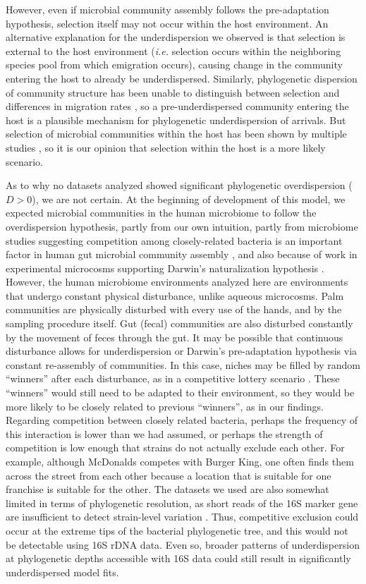\documentclass{article}
\begin{document}
\par
However, even if microbial community assembly follows the pre-adaptation hypothesis, selection itself may not occur within the host environment. An alternative explanation for the underdispersion we observed is that selection is external to the host environment (\emph{i.e.} selection occurs within the neighboring species pool from which emigration occurs), causing change in the community entering the host to already be underdispersed. Similarly, phylogenetic dispersion of community structure has been unable to distinguish between selection and differences in migration rates \cite{Emerson2008}, so a pre-underdispersed community entering the host is a plausible mechanism for phylogenetic underdispersion of arrivals. But selection of microbial communities within the host has been shown by multiple studies \cite{Peterfreund2012,David2014,Kennedy2016}, so it is our opinion that selection within the host is a more likely scenario.
\par
As to why no datasets analyzed showed significant phylogenetic overdispersion (\(D > 0\)), we are not certain. At the beginning of development of this model, we expected microbial communities in the human microbiome to follow the overdispersion hypothesis, partly from our own intuition, partly from microbiome studies suggesting competition among closely-related bacteria is an important factor in human gut microbial community assembly \cite{Chatzidaki-Livanis3627,Hecht1281}, and also because of work in experimental microcosms supporting Darwin’s naturalization hypothesis \cite{Peay2012}. However, the human microbiome environments analyzed here are environments that undergo constant physical disturbance, unlike aqueous microcosms. Palm communities are physically disturbed with every use of the hands, and by the sampling procedure itself. Gut (fecal) communities are also disturbed constantly by the movement of feces through the gut. It may be possible that continuous disturbance allows for underdispersion or Darwin’s pre-adaptation hypothesis via constant re-assembly of communities. In this case, niches may be filled by random “winners” after each disturbance, as in a competitive lottery scenario \cite{Verster2018}. These “winners” would still need to be adapted to their environment, so they would be more likely to be closely related to previous “winners”, as in our findings. Regarding competition between closely related bacteria, perhaps the frequency of this interaction is lower than we had assumed, or perhaps the strength of competition is low enough that strains do not actually exclude each other. For example, although McDonalds competes with Burger King, one often finds them across the street from each other because a location that is suitable for one franchise is suitable for the other. The datasets we used are also somewhat limited in terms of phylogenetic resolution, as short reads of the 16S marker gene are insufficient to detect strain-level variation \cite{Morowitz1128,Hecht1281,Tett2019}. Thus, competitive exclusion could occur at the extreme tips of the bacterial phylogenetic tree, and this would not be detectable using 16S rDNA data. Even so, broader patterns of underdispersion at phylogenetic depths accessible with 16S data could still result in significantly underdispersed model fits.
\end{document}
